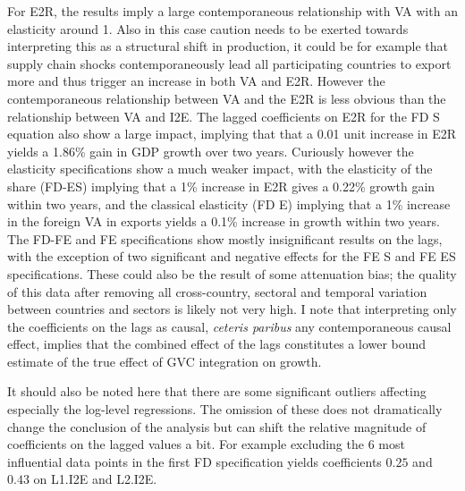 \documentclass[a4paper]{article}
\begin{document}


For E2R, the results imply a large contemporaneous relationship with VA with an elasticity around 1. Also in this case caution needs to be exerted towards interpreting this as a structural shift in production, it could be for example that supply chain shocks contemporaneously lead all participating countries to export more and thus trigger an increase in both VA and E2R. However the contemporaneous relationship between VA and the E2R is less obvious than the relationship between VA and I2E. The lagged coefficients on E2R for the FD S equation also show a large impact, implying that that a 0.01 unit increase in E2R yields a 1.86\% gain in GDP growth over two years. Curiously however the elasticity specifications show a much weaker impact, with the elasticity of the share (FD-ES) implying that a 1\% increase in E2R gives a 0.22\% growth gain within two years, and the classical elasticity (FD E) implying that a 1\% increase in the foreign VA in exports yields a 0.1\% increase in growth within two years. The FD-FE and FE specifications show mostly insignificant results on the lags, with the exception of two significant and negative effects for the FE S and FE ES specifications. These could also be the result of some attenuation bias; the quality of this data after removing all cross-country, sectoral and temporal variation between countries and sectors is likely not very high.  I note that interpreting only the coefficients on the lags as causal, \textit{ceteris paribus} any contemporaneous causal effect, implies that the combined effect of the lags constitutes a lower bound estimate of the true effect of GVC integration on growth.  %

It should also be noted here that there are some significant outliers affecting especially the log-level regressions. The omission of these does not dramatically change the conclusion of the analysis but can shift the relative magnitude of coefficients on the lagged values a bit. For example excluding the 6 most influential data points in the first FD specification yields coefficients $0.25$ and $0.43$ on L1.I2E and L2.I2E. \newline 
\end{document}

